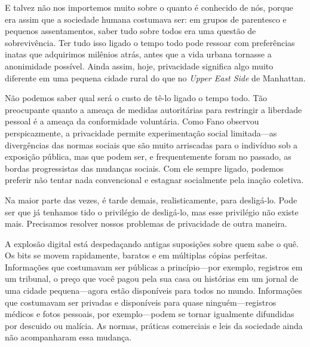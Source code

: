 \documentclass{book}
\newcommand{\ingles}[1]{\textit{#1}}
\begin{document}
E talvez não nos importemos muito sobre o quanto é conhecido de nós, porque era
assim que a sociedade humana costumava ser: em grupos de parentesco e pequenos
assentamentos, saber tudo sobre todos era uma questão de sobrevivência. Ter tudo
isso ligado o tempo todo pode ressoar com preferências inatas que adquirimos
milênios atrás, antes que a vida urbana tornasse a anonimidade possível. Ainda
assim, hoje, privacidade significa algo muito diferente em uma pequena cidade
rural do que no \ingles{Upper East Side} de Manhattan.

Não podemos saber qual será o custo de tê-lo ligado o tempo todo. Tão preocupante
quanto a ameaça de medidas autoritárias para restringir a liberdade pessoal é
a ameaça da conformidade voluntária. Como Fano observou perspicazmente, a 
privacidade permite experimentação social limitada---as divergências das normas
sociais que são muito arriscadas para o indivíduo sob a exposição pública, mas
que podem ser, e frequentemente foram no passado, as bordas progressistas das
mudanças sociais. Com ele sempre ligado, podemos preferir não tentar nada
convencional e estagnar socialmente pela inação coletiva.

Na maior parte das vezes, é tarde demais, realisticamente, para desligá-lo. Pode
ser que já tenhamos tido o privilégio de desligá-lo, mas esse privilégio não
existe mais. Precisamos resolver nossos problemas de privacidade de outra maneira.

A explosão digital está despedaçando antigas suposições sobre quem sabe o quê.
Os bits se movem rapidamente, baratos e em múltiplas cópias perfeitas.
Informações que costumavam ser públicas a princípio---por exemplo, registros em
um tribunal, o preço que você pagou pela sua casa ou histórias em um jornal de
uma cidade pequena---agora estão disponíveis para todos no mundo. Informações
que costumavam ser privadas e disponíveis para quase ninguém---registros
médicos e fotos pessoais, por exemplo---podem se tornar igualmente difundidas
por descuido ou malícia. As normas, práticas comerciais e leis da sociedade
ainda não acompanharam essa mudança.
\end{document}
